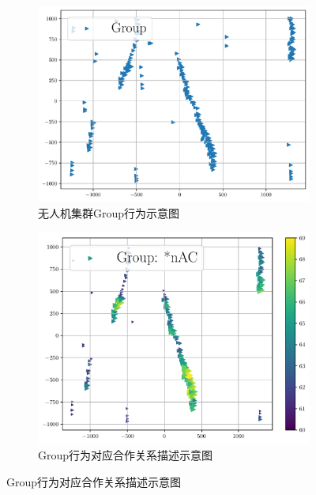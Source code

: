 \begin{figure}
     \centering
     \begin{subfigure}[b]{.45\textwidth}
         \centering
         \includegraphics[width=1\textwidth]{Img/chapter10/Class-group-sample5.pdf}   
         \caption{无人机集群Group行为示意图}
         \label{group-sample5-coh}
     \end{subfigure}
     \hfill
     \begin{subfigure}[b]{.45\textwidth}
         \centering
         \includegraphics[width=1\textwidth]{Img/chapter10/PI-Class-group-sample5.pdf}
         \caption{Group行为对应合作关系描述示意图}
         \label{group-sample5-coh1}
     \end{subfigure}

\end{figure}
